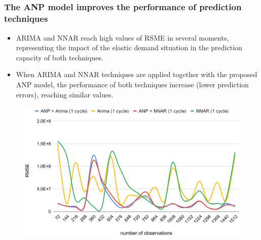 \documentclass[aspectratio=169]{beamer}
\begin{document}
\subsection{}
\begin{frame}
\frametitle{The ANP model improves the performance of prediction techniques}
\small

\begin{itemize}\footnotesize
 \item ARIMA and NNAR reach high values of RSME in several moments, representing the impact of the elastic demand situation in the prediction capacity of both techniques.
 \item When ARIMA and NNAR techniques are applied together with the proposed ANP model, the performance of both techniques increase (lower prediction errors), reaching similar values.
\end{itemize}

\vspace{-0.2cm}

\centering
\begin{figure}[!htb]
\centering
\includegraphics[height=0.35\textwidth,angle=0]{figura6.png}
\end{figure}

\end{frame}

\end{document}
